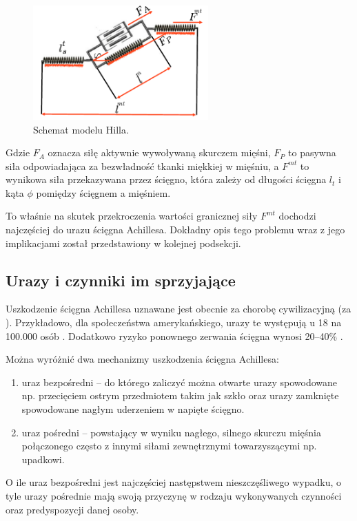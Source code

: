 \begin{figure}[h!]
	\centering
	\includegraphics[width=0.6\textwidth]{figures/Hill.png}
	\caption{Schemat modelu Hilla.}
	\label{hill-model}
\end{figure}

Gdzie $F_A$ oznacza siłę aktywnie wywoływaną skurczem mięśni, $F_P$ to pasywna siła odpowiadająca za bezwładność tkanki miękkiej w mięśniu, a $F^{mt}$ to wynikowa siła przekazywana przez ścięgno, która zależy od długości ścięgna $l_t$ i kąta $\phi$ pomiędzy ścięgnem a mięśniem. 

To właśnie na skutek przekroczenia wartości granicznej siły $F^{mt}$ dochodzi najczęściej do urazu ścięgna Achillesa. Dokładny opis tego problemu wraz z jego implikacjami został przedstawiony w kolejnej podsekcji.

\subsection{Urazy i czynniki im sprzyjające}

Uszkodzenie ścięgna Achillesa uznawane jest obecnie za chorobę cywilizacyjną (za \cite{Etiologia}). Przykładowo, dla społeczeństwa amerykańskiego, urazy te występują u 18 na 100.000 osób \cite{EpidemiologyUS}. Dodatkowo ryzyko ponownego zerwania ścięgna wynosi 20--40\% \cite{EpidemiologyUS}. 

Można wyróżnić dwa mechanizmy uszkodzenia ścięgna Achillesa: 
\begin{enumerate}
	\item uraz bezpośredni -- do którego zaliczyć można otwarte urazy spowodowane np. przecięciem ostrym przedmiotem takim jak szkło oraz urazy zamknięte spowodowane nagłym uderzeniem w napięte ścięgno.
	\item uraz pośredni -- powstający w wyniku nagłego, silnego skurczu mięśnia połączonego często z innymi siłami zewnętrznymi towarzyszącymi np. upadkowi.
\end{enumerate}
O ile uraz bezpośredni jest najczęściej następstwem nieszczęśliwego wypadku, o tyle urazy pośrednie mają swoją przyczynę w rodzaju wykonywanych czynności oraz predyspozycji danej osoby. 

